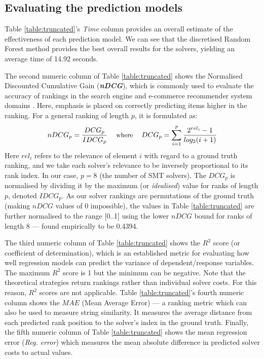 \documentclass[submission,copyright,creativecommons]{eptcs}
\begin{document}
\subsection{Evaluating the prediction models}

Table \ref{table:truncated}'s \textit{Time} column provides an overall estimate of the effectiveness of each prediction model.  We can see that the discretised Random Forest method provides the best overall results for the solvers, yielding an average time of 14.92 seconds.

The second numeric column of Table \ref{table:truncated} shows the 
Normalised Discounted Cumulative Gain (\textit{\textbf{nDCG}}), which is commonly used to evaluate the accuracy of rankings in the search engine and e-commerce recommender system domains \cite{NDCG}. Here, emphasis is placed on correctly predicting items higher in the ranking. For a general ranking of length $p$, it is formulated as:
\[\small
	nDCG_p = \frac{DCG_p}{IDCG_p}
    \quad\text{ where }\quad
    DCG_p = \sum_{i=1}^{p} \frac{2^{rel_i} - 1}{log_2(i+1)}
\]
Here $rel_i$ refers to the relevance of element $i$ with regard to a ground truth ranking, and we take each solver's relevance to be inversely proportional to its rank index.  In our case, $p = 8$ (the number of SMT solvers).  The $DCG_p$ is normalised by dividing it by the maximum (or \textit{idealised}) value for ranks of length $p$, denoted $IDCG_p$. As our solver rankings are permutations of the ground truth (making $nDCG$ values of 0 impossible), the values in Table \ref{table:truncated} are further normalised to the range [0..1] using the lower $nDCG$ bound for ranks of length 8 --- found empirically to be 0.4394. 

The third numeric column of Table \ref{table:truncated} shows
the $R^2$ score (or coefficient of determination), which is an established metric for evaluating how well regression models can predict the variance of dependent/response variables. The maximum $R^2$ score is 1 but the minimum can be negative. Note that the theoretical strategies return rankings rather than individual solver costs. For this reason, $R^2$ scores are not applicable. Table \ref{table:truncated}'s fourth numeric column shows the $MAE$ (Mean Average Error) --- a ranking metric which can also be used to measure string similarity. It measures the average distance from each predicted rank position to the solver's index in the ground truth. Finally, 
the fifth numeric column of Table \ref{table:truncated} shows
the mean regression error (\textit{Reg. error}) which measures the mean absolute difference in predicted solver costs to actual values. 
\end{document}
